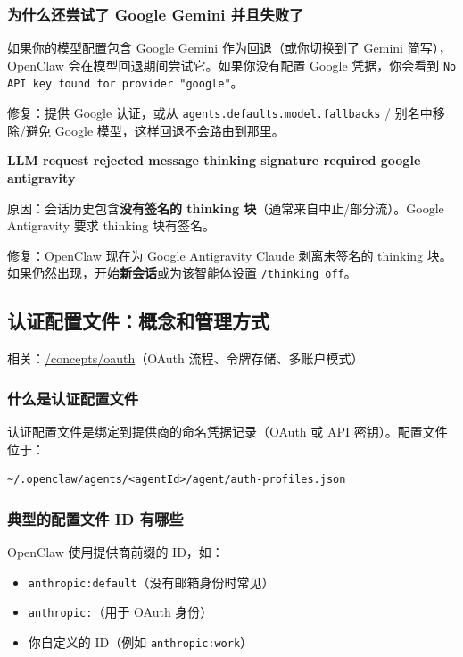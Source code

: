 \subsubsection{为什么还尝试了 Google Gemini 并且失败了}


如果你的模型配置包含 Google Gemini 作为回退（或你切换到了 Gemini 简写），OpenClaw 会在模型回退期间尝试它。如果你没有配置 Google 凭据，你会看到 \texttt{No API key found for provider "google"}。

修复：提供 Google 认证，或从 \texttt{agents.defaults.model.fallbacks} / 别名中移除/避免 Google 模型，这样回退不会路由到那里。

\textbf{LLM request rejected message thinking signature required google antigravity}

原因：会话历史包含\textbf{没有签名的 thinking 块}（通常来自中止/部分流）。Google Antigravity 要求 thinking 块有签名。

修复：OpenClaw 现在为 Google Antigravity Claude 剥离未签名的 thinking 块。如果仍然出现，开始\textbf{新会话}或为该智能体设置 \texttt{/thinking off}。

\subsection{认证配置文件：概念和管理方式}


相关：\href{/concepts/oauth}{/concepts/oauth}（OAuth 流程、令牌存储、多账户模式）

\subsubsection{什么是认证配置文件}


认证配置文件是绑定到提供商的命名凭据记录（OAuth 或 API 密钥）。配置文件位于：

\begin{lstlisting}
~/.openclaw/agents/<agentId>/agent/auth-profiles.json
\end{lstlisting}


\subsubsection{典型的配置文件 ID 有哪些}


OpenClaw 使用提供商前缀的 ID，如：

\begin{itemize}
  \item \texttt{anthropic:default}（没有邮箱身份时常见）
  \item \texttt{anthropic:}（用于 OAuth 身份）
  \item 你自定义的 ID（例如 \texttt{anthropic:work}）
\end{itemize}


